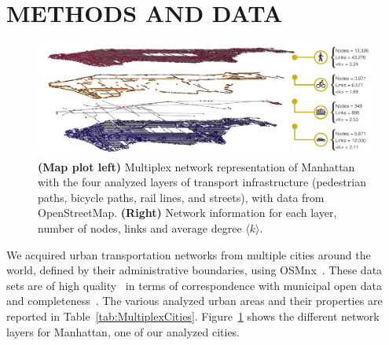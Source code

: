\section{METHODS AND DATA}

\begin{figure}[t!]
	\centering
	\includegraphics[width=\textwidth]{images/multiplex/Multilayer_NY_op2.png}
	\caption[Manhattan multiplex network]{\textbf{(Map plot left)} Multiplex network representation of Manhattan with the four analyzed layers of transport infrastructure (pedestrian paths, bicycle paths, rail lines, and streets), with data from OpenStreetMap. \textbf{(Right)} Network information for each layer, number of nodes, links and average degree $\langle k \rangle$.}
	\label{fig:ManhattanMultiplex}
\end{figure}


We acquired urban transportation networks from multiple cities around the world, defined by their administrative boundaries, using OSMnx~\cite{Boeing2017OSMNX}. These data sets are of high quality~\cite{Haklay2010OpenStreetMap,Girres2010Quality} in terms of correspondence with municipal open data~\cite{Ferster2019Bicycle} and completeness~\cite{Barbosa-Filho2017Models}. The various analyzed urban areas and their properties are reported in Table~\ref{tab:MultiplexCities}. Figure~\ref{fig:ManhattanMultiplex} shows the different network layers for Manhattan, one  of our analyzed cities.

